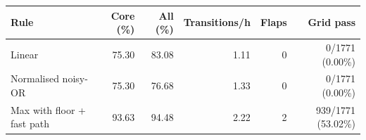 \begin{tabular}{@{}lrrrrr@{}}
\toprule
\textbf{Rule} & \textbf{Core (\%)} & \textbf{All (\%)} & \textbf{Transitions/h} & \textbf{Flaps} & \textbf{Grid pass} \\
\midrule
Linear & 75.30 & 83.08 & 1.11 & 0 & 0/1771 (0.00\%) \\
Normalised noisy-OR & 75.30 & 76.68 & 1.33 & 0 & 0/1771 (0.00\%) \\
Max with floor + fast path & 93.63 & 94.48 & 2.22 & 2 & 939/1771 (53.02\%) \\
\bottomrule
\end{tabular}
